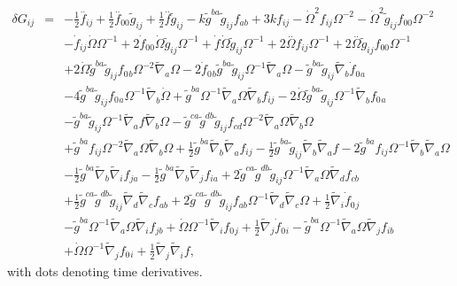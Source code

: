 \begin{eqnarray}
\\
\nonumber\\
\delta G_{ij}&=& - \tfrac{1}{2} \overset{..}{f}_{ij} + \tfrac{1}{2} \overset{..}{f}_{00}{} \tilde{g}_{ij} + \tfrac{1}{2} \overset{..}{f} \tilde{g}_{ij} -  k \tilde{g}^{ba} \tilde{g}_{ij} f_{ab} + 3 k f_{ij} -  \dot{\Omega}^2 f_{ij} \Omega^{-2} -  \dot{\Omega}^2 \tilde{g}_{ij} f_{00}{} \Omega^{-2} 
\nonumber\\
&& -  \dot{f}_{ij} \dot{\Omega} \Omega^{-1}  + 2 \dot{f}_{00}{} \dot{\Omega} \tilde{g}_{ij} \Omega^{-1} + \dot{f} \dot{\Omega} \tilde{g}_{ij} \Omega^{-1} + 2 \overset{..}{\Omega} f_{ij} \Omega^{-1} + 2 \overset{..}{\Omega} \tilde{g}_{ij} f_{00}{} \Omega^{-1} 
\nonumber\\
&& + 2 \dot{\Omega} \tilde{g}^{ba} \tilde{g}_{ij} f_{0}{}_{b} \Omega^{-2} \tilde{\nabla}_{a}\Omega  - 2 \dot{f}_{0}{}_{b} \tilde{g}^{ba} \tilde{g}_{ij} \Omega^{-1} \tilde{\nabla}_{a}\Omega -  \tilde{g}^{ba} \tilde{g}_{ij} \tilde{\nabla}_{b}\dot{f}_{0}{}_{a} 
\nonumber\\
&& - 4 \tilde{g}^{ba} \tilde{g}_{ij} f_{0}{}_{a} \Omega^{-1} \tilde{\nabla}_{b}\dot{\Omega} + \tilde{g}^{ba} \Omega^{-1} \tilde{\nabla}_{a}\Omega \tilde{\nabla}_{b}f_{ij} - 2 \dot{\Omega} \tilde{g}^{ba} \tilde{g}_{ij} \Omega^{-1} \tilde{\nabla}_{b}f_{0}{}_{a}
\nonumber\\
&&  -  \tilde{g}^{ba} \tilde{g}_{ij} \Omega^{-1} \tilde{\nabla}_{a}f \tilde{\nabla}_{b}\Omega -  \tilde{g}^{ca} \tilde{g}^{db} \tilde{g}_{ij} f_{cd} \Omega^{-2} \tilde{\nabla}_{a}\Omega \tilde{\nabla}_{b}\Omega \nonumber \\ 
&& + \tilde{g}^{ba} f_{ij} \Omega^{-2} \tilde{\nabla}_{a}\Omega \tilde{\nabla}_{b}\Omega + \tfrac{1}{2} \tilde{g}^{ba} \tilde{\nabla}_{b}\tilde{\nabla}_{a}f_{ij} -  \tfrac{1}{2} \tilde{g}^{ba} \tilde{g}_{ij} \tilde{\nabla}_{b}\tilde{\nabla}_{a}f - 2 \tilde{g}^{ba} f_{ij} \Omega^{-1} \tilde{\nabla}_{b}\tilde{\nabla}_{a}\Omega  
\nonumber\\
&& -  \tfrac{1}{2} \tilde{g}^{ba} \tilde{\nabla}_{b}\tilde{\nabla}_{i}f_{ja} -  \tfrac{1}{2} \tilde{g}^{ba} \tilde{\nabla}_{b}\tilde{\nabla}_{j}f_{ia} + 2 \tilde{g}^{ca} \tilde{g}^{db} \tilde{g}_{ij} \Omega^{-1} \tilde{\nabla}_{a}\Omega \tilde{\nabla}_{d}f_{cb} 
\nonumber\\
&& + \tfrac{1}{2} \tilde{g}^{ca} \tilde{g}^{db} \tilde{g}_{ij} \tilde{\nabla}_{d}\tilde{\nabla}_{c}f_{ab}  + 2 \tilde{g}^{ca} \tilde{g}^{db} \tilde{g}_{ij} f_{ab} \Omega^{-1} \tilde{\nabla}_{d}\tilde{\nabla}_{c}\Omega + \tfrac{1}{2} \tilde{\nabla}_{i}\dot{f}_{0}{}_{j} 
\nonumber\\
&& -  \tilde{g}^{ba} \Omega^{-1} \tilde{\nabla}_{a}\Omega \tilde{\nabla}_{i}f_{jb} + \dot{\Omega} \Omega^{-1} \tilde{\nabla}_{i}f_{0}{}_{j} + \tfrac{1}{2} \tilde{\nabla}_{j}\dot{f}_{0}{}_{i} -  \tilde{g}^{ba} \Omega^{-1} \tilde{\nabla}_{a}\Omega \tilde{\nabla}_{j}f_{ib}
\nonumber\\
&&  + \dot{\Omega} \Omega^{-1} \tilde{\nabla}_{j}f_{0}{}_{i} + \tfrac{1}{2} \tilde{\nabla}_{j}\tilde{\nabla}_{i}f,
\label{dg_conf31}
\end{eqnarray}
with dots denoting time derivatives. 
